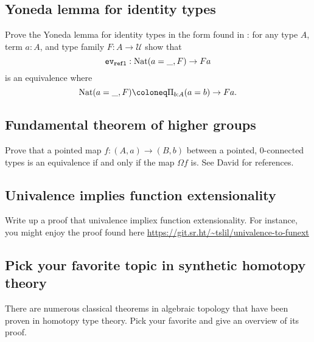 \documentclass{amsart}
\theoremstyle{definition}
\theoremstyle{remark}
\numberwithin{equation}{section}
\newcommand{\term}[1]{{\textup{\texttt{#1}}}}
\newcommand{\type}[1]{{\textup{#1}}}
\begin{document}
\subsection*{Yoneda lemma for identity types}

Prove the Yoneda lemma for identity types in the form found in  \cite{book-hott}: for any type $A$, term $a : A$, and type family $F : A \to \mathcal{U}$ show that
\[ \term{ev}_{\term{refl}} : \type{Nat}(a=\_, F) \to Fa\]
is an equivalence where
\[ \type{Nat}(a=\_, F) \coloneq \Pi_{b:A} (a=b) \to Fa.\]



\subsection*{Fundamental theorem of higher groups}

Prove that a pointed map $f : (A,a) \to (B,b)$ between a pointed, 0-connected types is an equivalence if and only if the map $\Omega f$ is. See David for references.


\subsection*{Univalence implies function extensionality}

Write up a proof that univalence impliex function extensionality. For instance, you might enjoy the proof found here \url{https://git.sr.ht/~tslil/univalence-to-funext}

\subsection*{Pick your favorite topic in synthetic homotopy theory}

There are numerous classical theorems in algebraic topology that have been proven in homotopy type theory. Pick your favorite and give an overview of its proof.
\end{document}
